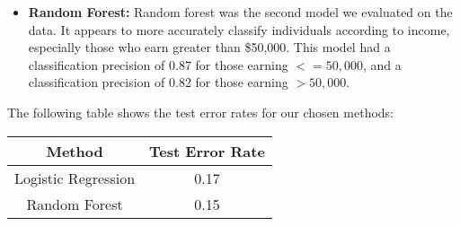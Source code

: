 \documentclass{article}
\begin{document}
\begin{itemize}
    \item \textbf{Random Forest:}  Random forest was the second model we evaluated on the data. It appears to more accurately classify individuals according to income, especially those who earn greater than \$50,000. This model had a classification precision of 0.87 for those earning $<=50,000$, and a classification precision of 0.82 for those earning $>50,000$.
\end{itemize}

The following table shows the test error rates for our chosen methods:
\begin{table}[h]
    \centering
    \begin{tabular}{c|c}
        \hline
        Method & Test Error Rate  \\
        \hline
        Logistic Regression & 0.17\\
        Random Forest & 0.15\\
        \hline
    \end{tabular}
    \label{tab:yourtable}
\end{table}
\end{document}
